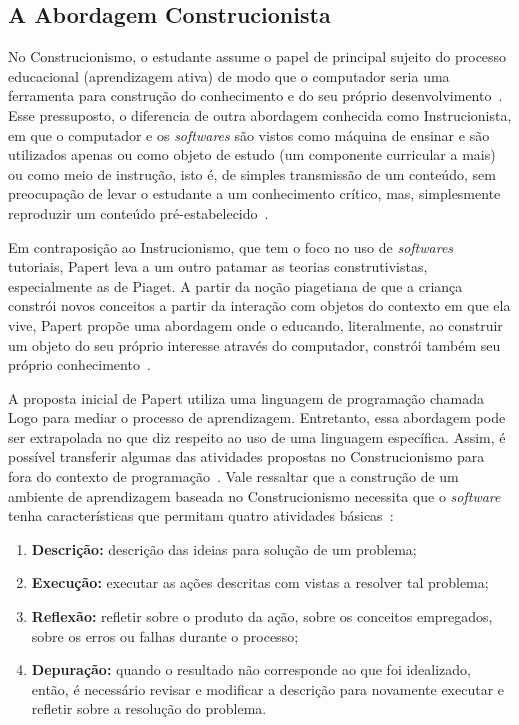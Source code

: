 

\subsection{A Abordagem Construcionista}\label{subsec:construcionismo}

No Construcionismo, o estudante assume o papel de principal sujeito do processo educacional (aprendizagem ativa) de modo que o computador seria uma ferramenta para construção do conhecimento e do seu próprio desenvolvimento~\citep{Valente:1993}. Esse pressuposto, o diferencia de outra abordagem conhecida como Instrucionista, em que o computador e os \textit{softwares} são vistos como máquina de ensinar e são utilizados apenas ou como objeto de estudo (um componente curricular a mais) ou como meio de instrução, isto é, de simples transmissão de um conteúdo, sem preocupação de levar o estudante a um conhecimento crítico, mas, simplesmente reproduzir um conteúdo pré-estabelecido~\citep{Almeida:2000,Valente:1993}.

Em contraposição ao Instrucionismo, que tem o foco no uso de \textit{softwares} tutoriais, Papert leva a um outro patamar as teorias construtivistas, especialmente as de Piaget. A partir da noção piagetiana de que a criança constrói novos conceitos a partir da interação com objetos do contexto em que ela vive, Papert propõe uma abordagem onde o educando, literalmente, ao construir um objeto do seu próprio interesse através do computador, constrói também seu próprio conhecimento~\citep{Valente:1993}.
  
A proposta inicial de Papert utiliza uma linguagem de programação chamada Logo para mediar o processo de aprendizagem. Entretanto, essa abordagem pode ser extrapolada no que diz respeito ao uso de uma linguagem específica. Assim, é possível transferir algumas das atividades propostas no Construcionismo para fora do contexto de programação~\citep{Almeida:2000}. Vale ressaltar que a construção de um ambiente de aprendizagem baseada no Construcionismo necessita que o \textit{software} tenha características que permitam quatro atividades básicas~\citep{Valente:1993}:

\begin{enumerate}
	\item \textbf{Descrição:} descrição das ideias para solução de um problema;
	\item \textbf{Execução:} executar as ações descritas com vistas a resolver tal problema;
	\item \textbf{Reflexão:} refletir sobre o produto da ação, sobre os conceitos empregados, sobre os erros ou falhas durante o processo;
	\item \textbf{Depuração:} quando o resultado não corresponde ao que foi idealizado, então, é necessário revisar e modificar a descrição para novamente executar e refletir sobre a resolução do problema.
\end{enumerate}  


